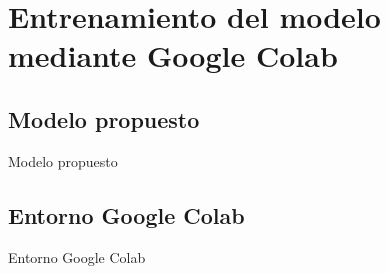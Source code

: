 \mbox{}


\chapter{Entrenamiento del modelo mediante Google Colab}
\label{ch:chapter2}


\section{Modelo propuesto}
Modelo propuesto
\section{Entorno Google Colab}
Entorno Google Colab